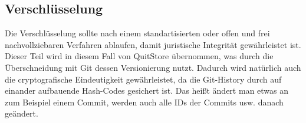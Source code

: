 \subsection{Verschlüsselung}
Die Verschlüsselung sollte nach einem standartisierten oder offen und frei nachvollziebaren Verfahren ablaufen, damit juristische Integrität gewährleistet ist. 
Dieser Teil wird in diesem Fall von QuitStore übernommen, was durch die Überschneidung mit Git dessen Versionierung nutzt. Dadurch wird natürlich auch die cryptografische Eindeutigkeit gewährleistet, da die Git-History durch auf einander aufbauende Hash-Codes gesichert ist. Das heißt ändert man etwas an zum Beispiel einem Commit, werden auch alle IDs der Commits usw. danach geändert.
